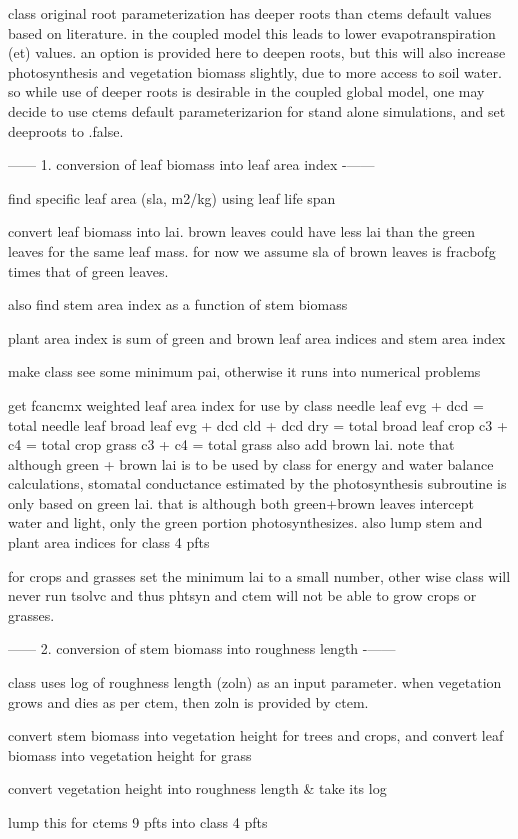 class\textquotesingle{} original root parameterization has deeper roots than ctem\textquotesingle{}s default values based on literature. in the coupled model this leads to lower evapotranspiration (et) values. an option is provided here to deepen roots, but this will also increase photosynthesis and vegetation biomass slightly, due to more access to soil water. so while use of deeper roots is desirable in the coupled global model, one may decide to use ctem\textquotesingle{}s default parameterizarion for stand alone simulations, and set deeproots to .false.

------ 1. conversion of leaf biomass into leaf area index -\/------

find specific leaf area (sla, m2/kg) using leaf life span

convert leaf biomass into lai. brown leaves could have less lai than the green leaves for the same leaf mass. for now we assume sla of brown leaves is fracbofg times that of green leaves.

also find stem area index as a function of stem biomass

plant area index is sum of green and brown leaf area indices and stem area index

make class see some minimum pai, otherwise it runs into numerical problems

get fcancmx weighted leaf area index for use by class needle leaf evg + dcd = total needle leaf broad leaf evg + dcd cld + dcd dry = total broad leaf crop c3 + c4 = total crop grass c3 + c4 = total grass also add brown lai. note that although green + brown lai is to be used by class for energy and water balance calculations, stomatal conductance estimated by the photosynthesis subroutine is only based on green lai. that is although both green+brown leaves intercept water and light, only the green portion photosynthesizes. also lump stem and plant area indices for class\textquotesingle{} 4 pfts

for crops and grasses set the minimum lai to a small number, other wise class will never run tsolvc and thus phtsyn and ctem will not be able to grow crops or grasses.

------ 2. conversion of stem biomass into roughness length -\/------

class uses log of roughness length (zoln) as an input parameter. when vegetation grows and dies as per ctem, then zoln is provided by ctem.


\begin{DoxyEnumerate}
\item convert stem biomass into vegetation height for trees and crops, and convert leaf biomass into vegetation height for grass
\item convert vegetation height into roughness length \& take its log
\item lump this for ctem\textquotesingle{}s 9 pfts into class\textquotesingle{} 4 pfts
\end{DoxyEnumerate}

